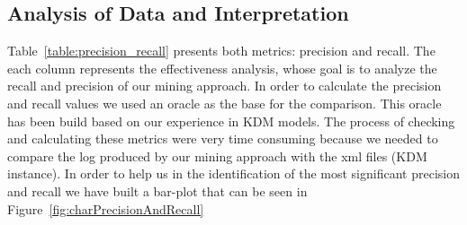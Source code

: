 
\subsection{Analysis of Data and Interpretation}\label{analysis_of_data}



Table~\ref{table:precision_recall} presents both metrics: precision and recall. The each column represents the effectiveness analysis, whose goal is to analyze the recall and precision of our mining approach. In order to calculate the precision and recall values we used an oracle as the base for the comparison. This oracle has been build based on our experience in KDM models. %
The process of checking and calculating these metrics were very time consuming because we needed to compare the log produced by our mining approach with the xml files (KDM instance). In order to help us in the identification of the most significant precision and recall we have built a bar-plot that can be seen in Figure~\ref{fig:charPrecisionAndRecall}

